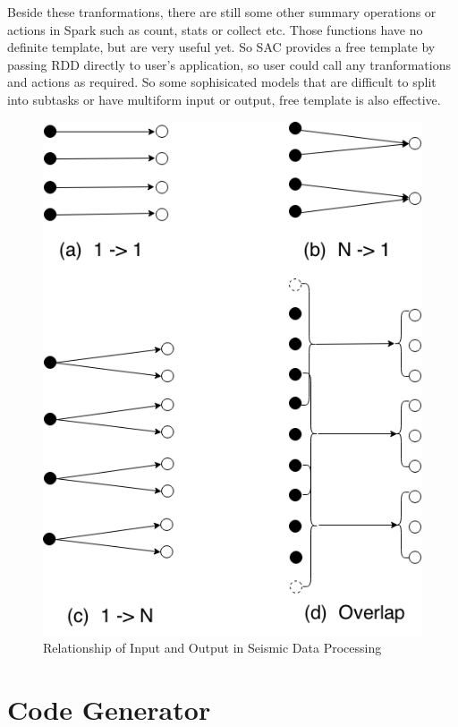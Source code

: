 Beside these tranformations, there are still some other summary operations or actions in Spark such as count, stats or collect etc. Those functions have no definite template, but are very useful yet. So SAC provides a free template by passing RDD directly to user's application, so user could call any tranformations and actions as required. So some sophisicated models that are difficult to split into subtasks or have multiform input or output, free template is also effective. 

\begin{figure}[H]
\centering
\includegraphics[scale=.50]{figures/template.png}
\caption{Relationship of Input and Output in Seismic Data Processing}
\label{Template}
\end{figure}

\section{Code Generator}

